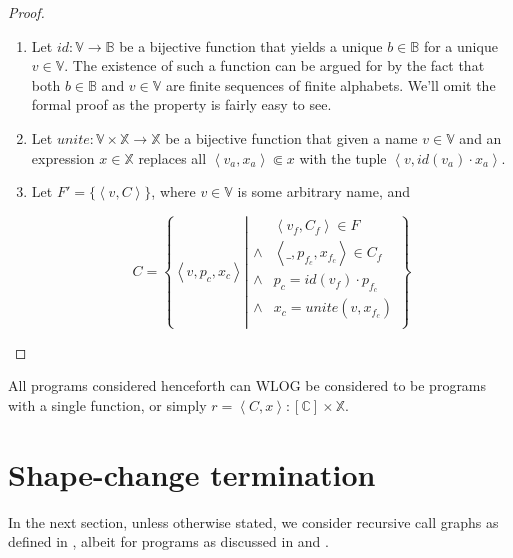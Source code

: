 \begin{proof}\ \\

\begin{enumerate}

\item Let $id : \mathbb{V} \rightarrow \mathbb{B}$ be a bijective function that
yields a unique $b\in\mathbb{B}$ for a unique $v\in\mathbb{V}$. The existence
of such a function can be argued for by the fact that both $b\in\mathbb{B}$ and
$v\in\mathbb{V}$ are finite sequences of finite alphabets. We'll omit the
formal proof as the property is fairly easy to see.

\item Let $unite : \mathbb{V} \times \mathbb{X} \rightarrow \mathbb{X}$ be a
bijective function that given a name $v\in\mathbb{V}$ and an expression
$x\in\mathbb{X}$ replaces all $\left\langle v_a, x_a \right\rangle\Subset x$
with the tuple $\left\langle v, id(v_a)\cdot x_a \right\rangle$.

\item Let $F'=\{ \left\langle v,C \right\rangle \}$, where $v\in\mathbb{V}$ is
some arbitrary name, and

$$C = \left\{ \left\langle v, p_c, x_c \right\rangle \left| 
\begin{array}{ll}
&\left\langle v_f,C_f\right\rangle\in F\\
\wedge &\left\langle \_, p_{f_c}, x_{f_c} \right\rangle \in C_f\\
\wedge &p_c = id(v_f)\cdot p_{f_c}\\
\wedge &x_c = unite(v,x_{f_c})\\
\end{array}
\right.\right\}$$

\end{enumerate}\end{proof}

\begin{definition}\label{definition:program-many-to-one} All programs
considered henceforth can WLOG be considered to be programs with a single
function, or simply $r = \left\langle C, x\right\rangle : [\mathbb{C}] \times
\mathbb{X}$.\end{definition}

\section{Shape-change termination}

In the next section, unless otherwise stated, we consider recursive call graphs
as defined in , albeit for programs
as discussed in  and
.

